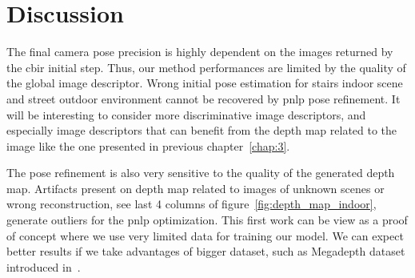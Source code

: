 \section{Discussion}
The final camera pose precision is highly dependent on the images returned by the \ac{cbir} initial step. Thus, our method performances are limited by the quality of the global image descriptor. Wrong initial pose estimation for stairs indoor scene and street outdoor environment cannot be recovered by \ac{pnlp} pose refinement. It will be interesting to consider more discriminative image descriptors, and especially image descriptors that can benefit from the depth map related to the image like the one presented in previous chapter~\ref{chap:3}.

The pose refinement is also very sensitive to the quality of the generated depth map. Artifacts present on depth map related to images of unknown scenes or wrong reconstruction, see last 4 columns of figure~\ref{fig:depth_map_indoor}, generate outliers for the \ac{pnlp} optimization. This first work can be view as a proof of concept where we use very limited data for training our model. We can expect better results if we take advantages of bigger dataset, such as Megadepth dataset introduced in~\citep{}.

